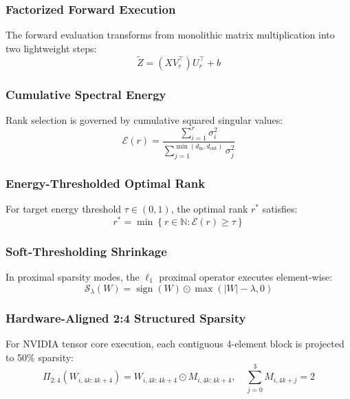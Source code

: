 {\subsubsection{Factorized Forward Execution}
The forward evaluation transforms from monolithic matrix multiplication into two lightweight steps:
\begin{equation}
\tilde{Z} = (X V_r^\top) U_r^\top + b
\end{equation}

\subsubsection{Cumulative Spectral Energy}
Rank selection is governed by cumulative squared singular values:
\begin{equation}
\mathcal{E}(r) = \frac{\sum_{i=1}^{r} \sigma_i^2}{\sum_{j=1}^{\min(d_{\text{in}}, d_{\text{out}})} \sigma_j^2}
\end{equation}

\subsubsection{Energy-Thresholded Optimal Rank}
For target energy threshold $\tau \in (0, 1)$, the optimal rank $r^*$ satisfies:
\begin{equation}
r^* = \min \left\{ r \in \mathbb{N} : \mathcal{E}(r) \ge \tau \right\}
\end{equation}

\subsubsection{Soft-Thresholding Shrinkage}
In proximal sparsity modes, the $\ell_1$ proximal operator executes element-wise:
\begin{equation}
\mathcal{S}_\lambda(W) = \operatorname{sign}(W) \odot \max(|W| - \lambda, 0)
\end{equation}

\subsubsection{Hardware-Aligned 2:4 Structured Sparsity}
For NVIDIA tensor core execution, each contiguous 4-element block is projected to 50\% sparsity:
\begin{equation}
\Pi_{2:4}(W_{i, 4k:4k+4}) = W_{i, 4k:4k+4} \odot M_{i, 4k:4k+4}, \quad \sum_{j=0}^{3} M_{i, 4k+j} = 2
\end{equation}

}
